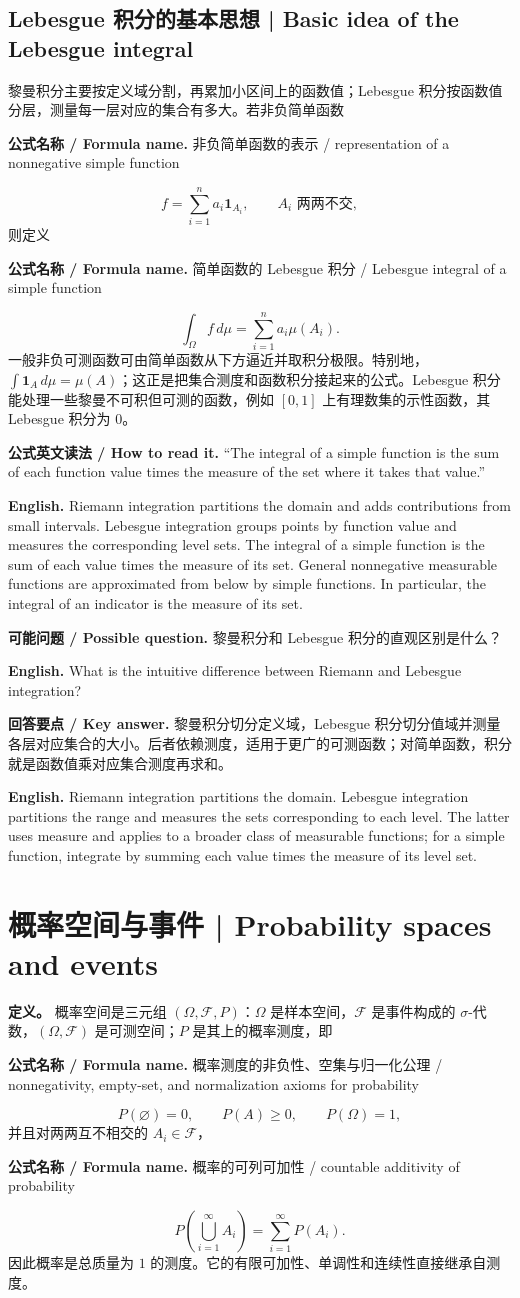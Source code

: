 \documentclass[UTF8,11pt,a4paper]{ctexart}
\newcommand{\EN}[1]{\par\noindent\textbf{English.} #1\par}
\newcommand{\READ}[1]{\par\noindent\textbf{公式英文读法 / How to read it.} #1\par}
\newcommand{\FORMULA}[2]{\par\noindent\textbf{公式名称 / Formula name.} #1 / #2\par}
\newcommand{\ASK}[4]{\par\noindent\textbf{可能问题 / Possible question.} #1\par\EN{#2}\noindent\textbf{回答要点 / Key answer.} #3\par\EN{#4}\medskip}
\begin{document}
\subsection{Lebesgue 积分的基本思想 | Basic idea of the Lebesgue integral}
\noindent 黎曼积分主要按定义域分割，再累加小区间上的函数值；Lebesgue 积分按函数值分层，测量每一层对应的集合有多大。若非负简单函数
\FORMULA{非负简单函数的表示}{representation of a nonnegative simple function}
\[
f=\sum_{i=1}^{n}a_i\mathbf1_{A_i},\qquad A_i\text{ 两两不交},
\]
则定义
\FORMULA{简单函数的 Lebesgue 积分}{Lebesgue integral of a simple function}
\[
\int_\Omega f\,d\mu=\sum_{i=1}^{n}a_i\mu(A_i).
\]
一般非负可测函数可由简单函数从下方逼近并取积分极限。特别地，$\int\mathbf1_A\,d\mu=\mu(A)$；这正是把集合测度和函数积分接起来的公式。Lebesgue 积分能处理一些黎曼不可积但可测的函数，例如 $[0,1]$ 上有理数集的示性函数，其 Lebesgue 积分为 $0$。
\READ{“The integral of a simple function is the sum of each function value times the measure of the set where it takes that value.”}
\EN{Riemann integration partitions the domain and adds contributions from small intervals. Lebesgue integration groups points by function value and measures the corresponding level sets. The integral of a simple function is the sum of each value times the measure of its set. General nonnegative measurable functions are approximated from below by simple functions. In particular, the integral of an indicator is the measure of its set.}

\ASK{黎曼积分和 Lebesgue 积分的直观区别是什么？}{What is the intuitive difference between Riemann and Lebesgue integration?}{黎曼积分切分定义域，Lebesgue 积分切分值域并测量各层对应集合的大小。后者依赖测度，适用于更广的可测函数；对简单函数，积分就是函数值乘对应集合测度再求和。}{Riemann integration partitions the domain. Lebesgue integration partitions the range and measures the sets corresponding to each level. The latter uses measure and applies to a broader class of measurable functions; for a simple function, integrate by summing each value times the measure of its level set.}

\section{概率空间与事件 | Probability spaces and events}
\noindent\textbf{定义。} 概率空间是三元组 $(\Omega,\mathcal F,P)$：$\Omega$ 是样本空间，$\mathcal F$ 是事件构成的 $\sigma$-代数，$(\Omega,\mathcal F)$ 是可测空间；$P$ 是其上的概率测度，即
\FORMULA{概率测度的非负性、空集与归一化公理}{nonnegativity, empty-set, and normalization axioms for probability}
\[
P(\varnothing)=0,\qquad P(A)\ge0,\qquad P(\Omega)=1,
\]
并且对两两互不相交的 $A_i\in\mathcal F$，
\FORMULA{概率的可列可加性}{countable additivity of probability}
\[
P\left(\bigcup_{i=1}^{\infty}A_i\right)=\sum_{i=1}^{\infty}P(A_i).
\]
因此概率是总质量为 $1$ 的测度。它的有限可加性、单调性和连续性直接继承自测度。
\end{document}
